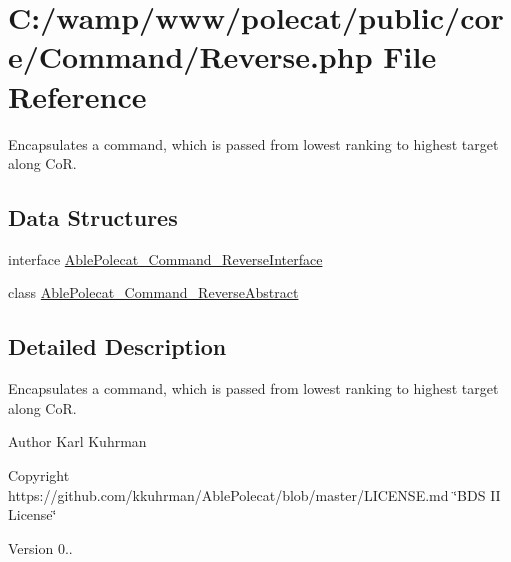 \hypertarget{_reverse_8php}{}\section{C\+:/wamp/www/polecat/public/core/\+Command/\+Reverse.php File Reference}
\label{_reverse_8php}


Encapsulates a command, which is passed from lowest ranking to highest target along Co\+R.  


\subsection*{Data Structures}
\begin{DoxyCompactItemize}
\item 
interface \hyperlink{interface_able_polecat___command___reverse_interface}{Able\+Polecat\+\_\+\+Command\+\_\+\+Reverse\+Interface}
\item 
class \hyperlink{class_able_polecat___command___reverse_abstract}{Able\+Polecat\+\_\+\+Command\+\_\+\+Reverse\+Abstract}
\end{DoxyCompactItemize}


\subsection{Detailed Description}
Encapsulates a command, which is passed from lowest ranking to highest target along Co\+R. 

\begin{DoxyAuthor}{Author}
Karl Kuhrman 
\end{DoxyAuthor}
\begin{DoxyCopyright}{Copyright}
https\+://github.com/kkuhrman/\+Able\+Polecat/blob/master/\+L\+I\+C\+E\+N\+S\+E.\+md \char`\"{}\+B\+D\+S I\+I License\char`\"{} 
\end{DoxyCopyright}
\begin{DoxyVersion}{Version}
0.. 
\end{DoxyVersion}

